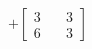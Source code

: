 \documentclass[preview]{standalone}
\begin{document}
\begin{align*}
+\begin{bmatrix} 3 & \quad 3 \\ 6 & \quad 3 \end{bmatrix}
\end{align*}
\end{document}
